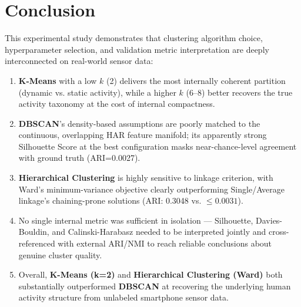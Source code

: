 \documentclass[12pt,a4paper]{article}
\begin{document}
\section{Conclusion}
This experimental study demonstrates that clustering algorithm choice, hyperparameter selection, and validation metric interpretation are deeply interconnected on real-world sensor data:
\begin{enumerate}
\item \textbf{K-Means} with a low $k$ (2) delivers the most internally coherent partition (dynamic vs. static activity), while a higher $k$ (6--8) better recovers the true activity taxonomy at the cost of internal compactness.
\item \textbf{DBSCAN}'s density-based assumptions are poorly matched to the continuous, overlapping HAR feature manifold; its apparently strong Silhouette Score at the best configuration masks near-chance-level agreement with ground truth (ARI=0.0027).
\item \textbf{Hierarchical Clustering} is highly sensitive to linkage criterion, with Ward's minimum-variance objective clearly outperforming Single/Average linkage's chaining-prone solutions (ARI: 0.3048 vs. $\le 0.0031$).
\item No single internal metric was sufficient in isolation — Silhouette, Davies-Bouldin, and Calinski-Harabasz needed to be interpreted jointly and cross-referenced with external ARI/NMI to reach reliable conclusions about genuine cluster quality.
\item Overall, \textbf{K-Means (k=2)} and \textbf{Hierarchical Clustering (Ward)} both substantially outperformed \textbf{DBSCAN} at recovering the underlying human activity structure from unlabeled smartphone sensor data.
\end{enumerate}
\end{document}
